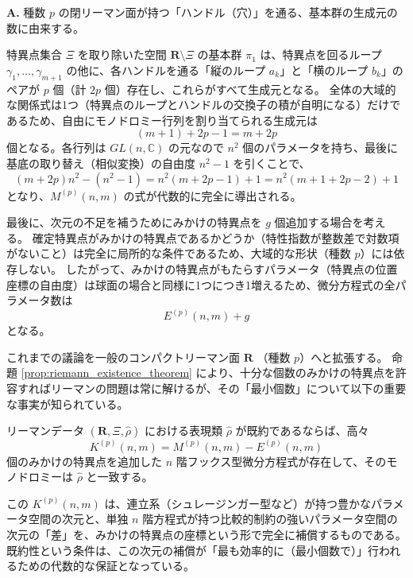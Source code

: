 \begin{Q}
\textbf{A.} 種数 $p$ の閉リーマン面が持つ「ハンドル（穴）」を通る、基本群の生成元の数に由来する。

特異点集合 $\Xi$ を取り除いた空間 $\mathbf{R} \setminus \Xi$ の基本群 $\pi_1$ は、特異点を回るループ $\gamma_1, \dots, \gamma_{m+1}$ の他に、各ハンドルを通る「縦のループ $a_k$」と「横のループ $b_k$」のペアが $p$ 個（計 $2p$ 個）存在し、これらがすべて生成元となる。
全体の大域的な関係式は1つ（特異点のループとハンドルの交換子の積が自明になる）だけであるため、自由にモノドロミー行列を割り当てられる生成元は
\[
(m+1) + 2p - 1 = m + 2p
\]
個となる。各行列は $GL(n, \mathbb{C})$ の元なので $n^2$ 個のパラメータを持ち、最後に基底の取り替え（相似変換）の自由度 $n^2 - 1$ を引くことで、
\[
(m+2p)n^2 - (n^2 - 1) = n^2(m+2p-1) + 1 = n^2(m+1+2p-2) + 1
\]
となり、$M^{(p)}(n,m)$ の式が代数的に完全に導出される。
\end{Q}

最後に、次元の不足を補うためにみかけの特異点を $g$ 個追加する場合を考える。
確定特異点がみかけの特異点であるかどうか（特性指数が整数差で対数項がないこと）は完全に局所的な条件であるため、大域的な形状（種数 $p$）には依存しない。
したがって、みかけの特異点がもたらすパラメータ（特異点の位置座標の自由度）は球面の場合と同様に1つにつき1増えるため、微分方程式の全パラメータ数は
\[
E^{(p)}(n,m) + g
\]
となる。


これまでの議論を一般のコンパクトリーマン面 $\mathbf{R}$ （種数 $p$）へと拡張する。
命題 \ref{prop:riemann_existence_theorem} により、十分な個数のみかけの特異点を許容すればリーマンの問題は常に解けるが、その「最小個数」について以下の重要な事実が知られている。

\begin{proposition}\label{prop:minimal_singularities}
    リーマンデータ $(\mathbf{R}, \Xi, \hat{\rho})$ における表現類 $\hat{\rho}$ が既約であるならば、高々
    \[
    K^{(p)}(n,m) = M^{(p)}(n,m) - E^{(p)}(n,m)
    \]
    個のみかけの特異点を追加した $n$ 階フックス型微分方程式が存在して、そのモノドロミーは $\hat{\rho}$ と一致する。
\end{proposition}

この $K^{(p)}(n,m)$ は、連立系（シュレージンガー型など）が持つ豊かなパラメータ空間の次元と、単独 $n$ 階方程式が持つ比較的制約の強いパラメータ空間の次元の「差」を、みかけの特異点の座標という形で完全に補償するものである。
既約性という条件は、この次元の補償が「最も効率的に（最小個数で）」行われるための代数的な保証となっている。

